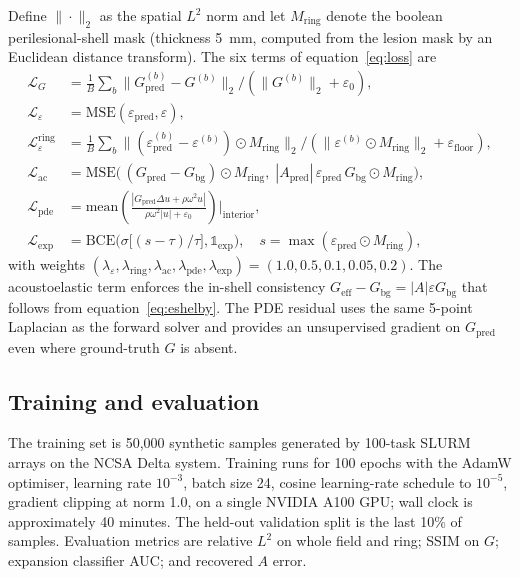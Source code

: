 \documentclass[11pt,letterpaper]{article}
\newcommand{\Geff}{G_{\mathrm{eff}}}
\newcommand{\Gbg}{G_{\mathrm{bg}}}
\newcommand{\eps}{\varepsilon}
\begin{document}
Define $\|\cdot\|_{2}$ as the spatial $L^{2}$ norm and let
$M_{\mathrm{ring}}$ denote the boolean perilesional-shell mask
(thickness 5~mm, computed from the lesion mask by an Euclidean distance
transform). The six terms of equation~\eqref{eq:loss} are
\begin{align*}
\mathcal{L}_{G} &= \tfrac{1}{B}\sum_{b}
    \|G^{(b)}_{\mathrm{pred}}-G^{(b)}\|_{2} /
    (\|G^{(b)}\|_{2}+\eps_{0}),\\
\mathcal{L}_{\eps} &= \mathrm{MSE}(\eps_{\mathrm{pred}},\eps),\\
\mathcal{L}^{\mathrm{ring}}_{\eps} &=
    \tfrac{1}{B}\sum_{b}
    \|(\eps^{(b)}_{\mathrm{pred}}-\eps^{(b)})\odot M_{\mathrm{ring}}\|_{2}/
    (\|\eps^{(b)}\odot M_{\mathrm{ring}}\|_{2}+\eps_{\mathrm{floor}}),\\
\mathcal{L}_{\mathrm{ac}} &=
    \mathrm{MSE}\bigl(\,(G_{\mathrm{pred}}-\Gbg)\odot M_{\mathrm{ring}},\;
    |A_{\mathrm{pred}}|\,\eps_{\mathrm{pred}}\,\Gbg\odot M_{\mathrm{ring}}\bigr),\\
\mathcal{L}_{\mathrm{pde}} &=
    \mathrm{mean}\!\left(
    \frac{|G_{\mathrm{pred}}\Delta u + \rho\omega^{2}u|}
         {\rho\omega^{2}|u|+\eps_{0}}
    \right)\Big|_{\mathrm{interior}},\\
\mathcal{L}_{\mathrm{exp}} &=
    \mathrm{BCE}\!\bigl(\sigma\!\bigl[(s-\tau)/\tau\bigr],
    \mathbb{1}_{\mathrm{exp}}\bigr),\quad
    s=\max(\eps_{\mathrm{pred}}\odot M_{\mathrm{ring}}),
\end{align*}
with weights
$(\lambda_{\eps},\lambda_{\mathrm{ring}},\lambda_{\mathrm{ac}},
\lambda_{\mathrm{pde}},\lambda_{\mathrm{exp}})=(1.0,0.5,0.1,0.05,0.2)$.
The acoustoelastic term enforces the in-shell consistency
$\Geff-\Gbg=|A|\eps\Gbg$ that follows from equation~\eqref{eq:eshelby}.
The PDE residual uses the same 5-point Laplacian as the forward solver
and provides an unsupervised gradient on $G_{\mathrm{pred}}$ even where
ground-truth $G$ is absent.

\subsection*{Training and evaluation}
\label{sec:methods-train}

The training set is 50{,}000 synthetic samples generated by 100-task SLURM
arrays on the NCSA Delta system. Training runs for 100 epochs with the
AdamW optimiser, learning rate $10^{-3}$, batch size 24, cosine learning-rate
schedule to $10^{-5}$, gradient clipping at norm 1.0, on a single
NVIDIA A100 GPU; wall clock is approximately 40 minutes. The held-out
validation split is the last 10\% of samples. Evaluation metrics are
relative $L^{2}$ on whole field and ring; SSIM on $G$; expansion classifier
AUC; and recovered $A$ error.
\end{document}
